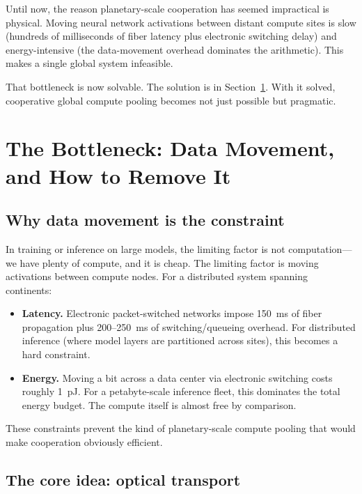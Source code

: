 \documentclass[12pt]{article}
\begin{document}
Until now, the reason planetary-scale cooperation has seemed impractical is
physical. Moving neural network activations between distant compute sites is
slow (hundreds of milliseconds of fiber latency plus electronic switching delay)
and energy-intensive (the data-movement overhead dominates the arithmetic). This
makes a single global system infeasible.

That bottleneck is now solvable. The solution is in Section~\ref{sec:bottleneck}.
With it solved, cooperative global compute pooling becomes not just possible but
pragmatic.

\section{The Bottleneck: Data Movement, and How to Remove It}
\label{sec:bottleneck}

\subsection{Why data movement is the constraint}

In training or inference on large models, the limiting factor is not
computation---we have plenty of compute, and it is cheap. The limiting factor is
moving activations between compute nodes. For a distributed system spanning
continents:
\begin{itemize}[leftmargin=1.6em,itemsep=4pt]
  \item \textbf{Latency.} Electronic packet-switched networks impose 150~ms of
  fiber propagation plus 200--250~ms of switching/queueing overhead. For
  distributed inference (where model layers are partitioned across sites), this
  becomes a hard constraint.
  \item \textbf{Energy.} Moving a bit across a data center via electronic
  switching costs roughly \SI{1}{pJ}. For a petabyte-scale inference fleet,
  this dominates the total energy budget. The compute itself is almost free by
  comparison.
\end{itemize}

\noindent These constraints prevent the kind of planetary-scale compute pooling that would
make cooperation obviously efficient.

\subsection{The core idea: optical transport}
\end{document}
